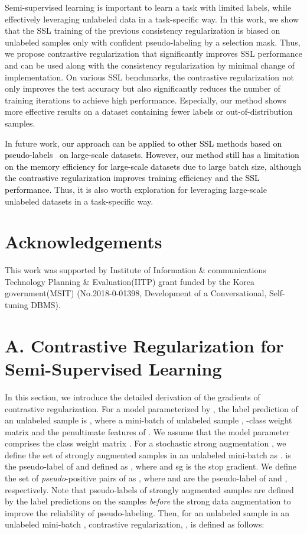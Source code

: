 \documentclass[letterpaper]{article} \usepackage{aaai22}  \usepackage{times}  \usepackage{helvet}  \usepackage{courier}  \usepackage[hyphens]{url}  \usepackage{graphicx} \urlstyle{rm} \def\UrlFont{\rm}  \usepackage{natbib}  \usepackage{caption} \DeclareCaptionStyle{ruled}{labelfont=normalfont,labelsep=colon,strut=off} \frenchspacing  \setlength{\pdfpagewidth}{8.5in}  \setlength{\pdfpageheight}{11in}  \usepackage{algorithm}
\begin{document}
Semi-supervised learning is important to learn a task with limited labels, while effectively leveraging unlabeled data in a task-specific way.
In this work, we show that the SSL training of the previous consistency regularization is biased on unlabeled samples only with confident pseudo-labeling by a selection mask.
Thus, we propose contrastive regularization that significantly improves SSL performance and can be used along with the consistency regularization by minimal change of implementation.
On various SSL benchmarks, the contrastive regularization not only improves the test accuracy but also significantly reduces the number of training iterations to achieve high performance.
Especially, our method shows more effective results on a dataset containing fewer labels or out-of-distribution samples.

In future work, 
\textcolor{black}{our approach can be applied to other SSL methods based on pseudo-labels~\cite{xie2020self,chen2020big} on large-scale datasets. However, our method still has a limitation on the memory efficiency for large-scale datasets due to large batch size, although the contrastive regularization improves training efficiency and the SSL performance.}
Thus, it is also worth exploration for leveraging large-scale unlabeled datasets in a task-specific way.
{


\section{Acknowledgements}
This work was supported by Institute of Information \& communications Technology Planning \& Evaluation(IITP) grant funded by the Korea government(MSIT) (No.2018-0-01398, Development of a Conversational, Self-tuning DBMS).

}

\clearpage
\appendix
\onecolumn



\section{A. Contrastive Regularization for Semi-Supervised Learning}
In this section, we introduce the detailed derivation of the gradients of contrastive regularization.
For a model parameterized by , the label prediction of an unlabeled sample  is , where a mini-batch of unlabeled sample , -class weight matrix   and the penultimate features of  .
We assume that the model parameter  comprises the class weight matrix .
For a stochastic strong augmentation , we define the set of  strongly augmented samples in an unlabeled mini-batch as .
 is the pseudo-label of  and defined as , where  and sg is the stop gradient.
We define the set of \textit{pseudo}-positive pairs of  as , where  and  are the pseudo-label of  and , respectively.
Note that pseudo-labels of strongly augmented samples are defined by the label predictions on the samples \textit{before} the strong data augmentation to improve the reliability of pseudo-labeling.
Then, for an unlabeled sample  in an unlabeled mini-batch , contrastive regularization, , is defined as follows:
\end{document}

